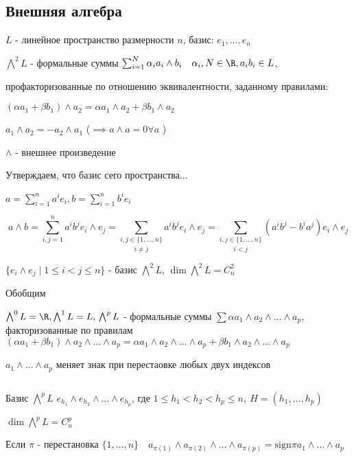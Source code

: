   \subsection*{Внешняя алгебра}

  $L$ - линейное пространство размерности $n$, базис: $e_1, \dotsc, e_n$

  $\bigwedge^2 L$ - формальные суммы $\sum^N_{i=1} \alpha_i a_i \land b_i \quad \alpha_i, N \in \R, a_ib_i \in L$,


  профакторизованные по отношению эквивалентности, заданному правилами:

  $(\alpha a_1 + \beta b_1) \land a_2 = \alpha a_1 \land a_2 + \beta b_1 \land a_2$

  $a_1 \land a_2 = - a_2 \land a_1$ \quad ($\implies a\land a = 0 \forall a$ )

  $\land $ - внешнее произведение

  Утверждаем, что базис сего пространства...

  $a = \sum^n_{i=1} a^i e_i, b = \sum^n_{i=1}b^i e_i$

  $$a\land b  = \sum^n_{i,j=1}a^ib^je_i\land e_j = \underset{i \neq j}{\sum_{i,j \in \{1,\dotsc, n\}}} a^ib^je_i\land e_j = \underset{i<j}{\sum_{i,j \in \{1,\dotsc,n\}}} (a^ib^j - b^ia^j)e_i\land e_j$$

  $\{e_i \land e_j \mid 1 \le i < j \le n\}$ - базис $\bigwedge^2 L$, $\dim \bigwedge^2L = C_n^2$

  \par Обобщим

  \par $\bigwedge^0L = \R, \bigwedge^1L = L, \\\bigwedge^pL$ - формальные суммы $\sum \alpha a_1 \land a_2 \land \dotsc \land a_p$, факторизованные по правилам 
  $(\alpha a_1 + \beta b_1) \land a_2 \land \dotsc \land a_p = \alpha a_1 \land a_2 \land \dotsc \land a_p + \beta b_1\land a_2\land \dotsc \land a_p$

  $a_1 \land \dotsc \land a_p$ меняет знак при перестаовке любых двух индексов

  \par $ $

  Базис $\bigwedge^pL$ \quad $e_{h_1}\land e_{h_2} \land \dotsc \land e_{h_p}$, где $1 \le h_1 < h_2 < h_p \le n,\ H = (h_1, \dotsc, h_p)$

  $\dim \bigwedge^pL = C^p_n$

  Если $\pi$ - перестановка $\{1, \dotsc, n\} \quad a_{\pi(1)}\land a_{\pi(2)} \land \dotsc \land a_{\pi(p)} = \text{sign}\pi a_1 \land \dotsc \land a_p$

